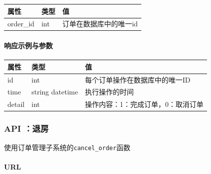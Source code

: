 \documentclass[]{article}
\let\oldparagraph\paragraph
\renewcommand{\paragraph}[1]{\oldparagraph{#1}\mbox{}}
\begin{document}
\begin{Shaded}
\begin{Highlighting}[]
\FunctionTok{\{}
    \FunctionTok{:} 
\FunctionTok{\}}
\end{Highlighting}
\end{Shaded}

\begin{longtable}[]{@{}lll@{}}
\toprule
属性 & 类型 & 值\tabularnewline
\midrule
\endhead
order\_id & int & 订单在数据库中的唯一id\tabularnewline
\bottomrule
\end{longtable}

\hypertarget{ux54cdux5e94ux793aux4f8bux4e0eux53c2ux6570-2}{%
\paragraph{响应示例与参数}\label{ux54cdux5e94ux793aux4f8bux4e0eux53c2ux6570-2}}

\begin{Shaded}
\begin{Highlighting}[]
\FunctionTok{\{}
    \FunctionTok{:} \OtherTok{[}
    \FunctionTok{\{}
        \FunctionTok{:} \FunctionTok{,}
        \FunctionTok{:} \FunctionTok{,}
        \FunctionTok{:} \FunctionTok{,}
    \FunctionTok{\}}\OtherTok{,}
    \FunctionTok{\{}
    \FunctionTok{\}}
\OtherTok{]}
\FunctionTok{\}}
\end{Highlighting}
\end{Shaded}

\begin{longtable}[]{@{}lll@{}}
\toprule
属性 & 类型 & 值\tabularnewline
\midrule
\endhead
id & int & 每个订单操作在数据库中的唯一ID\tabularnewline
time & string datetime & 执行操作的时间\tabularnewline
detail & int & 操作内容：1：完成订单，0：取消订单\tabularnewline
\bottomrule
\end{longtable}

\hypertarget{api-ux9000ux623f}{%
\subsubsection{API ：退房}\label{api-ux9000ux623f}}

使用订单管理子系统的\texttt{cancel\_order}函数

\hypertarget{url-6}{%
\paragraph{URL}\label{url-6}}
\end{document}
